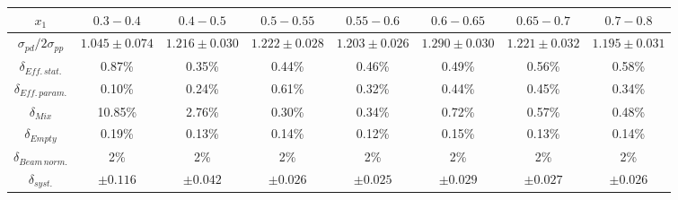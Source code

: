 \begin{tabular}{c|ccccccc}
\hline
$x_1$                      & $0.3-0.4$       & $0.4-0.5$       & $0.5-0.55$      & $0.55-0.6$      & $0.6-0.65$      & $0.65-0.7$      & $0.7-0.8$       \\ \hline
$\sigma_{pd}/2\sigma_{pp}$ & $1.045\pm0.074$ & $1.216\pm0.030$ & $1.222\pm0.028$ & $1.203\pm0.026$ & $1.290\pm0.030$ & $1.221\pm0.032$ & $1.195\pm0.031$ \\ \hline
$\delta_{Eff.\,stat.}$     & 0.87\%          & 0.35\%          & 0.44\%          & 0.46\%          & 0.49\%          & 0.56\%           & 0.58\%          \\
$\delta_{Eff.\,param.}$    & 0.10\%          & 0.24\%          & 0.61\%          & 0.32\%          & 0.44\%          & 0.45\%          & 0.34\%          \\
$\delta_{Mix}$             & 10.85\%         & 2.76\%          & 0.30\%          & 0.34\%          & 0.72\%          & 0.57\%          & 0.48\%          \\
$\delta_{Empty}$           & 0.19\%          & 0.13\%          & 0.14\%          & 0.12\%          & 0.15\%          & 0.13\%          & 0.14\%          \\
$\delta_{Beam\,norm.}$     & 2\%             & 2\%             & 2\%             & 2\%             & 2\%             & 2\%             & 2\%             \\ \hline
$\delta_{syst.}$           & $\pm0.116$      & $\pm0.042$      & $\pm0.026$      & $\pm0.025$      & $\pm0.029$      & $\pm0.027$      & $\pm0.026$      \\ \hline
\end{tabular}
